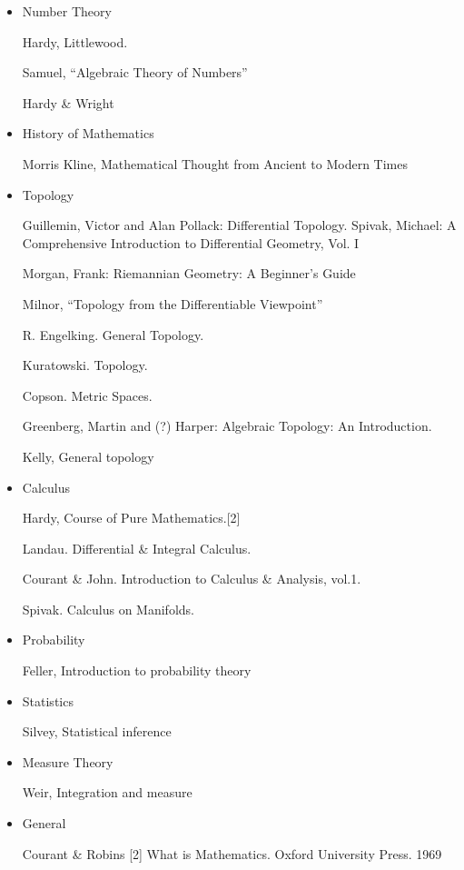 \begin{itemize}
  \item Number Theory

  Hardy, Littlewood.

  Samuel, ``Algebraic Theory of Numbers''

  Hardy \& Wright

  \item History of Mathematics

  Morris Kline, Mathematical Thought from Ancient to Modern Times

  \item Topology

  Guillemin, Victor and Alan Pollack: Differential Topology.  Spivak,
  Michael: A Comprehensive Introduction to Differential Geometry, Vol. I

  Morgan, Frank: Riemannian Geometry: A Beginner's Guide

  Milnor, ``Topology from the Differentiable Viewpoint''

  R. Engelking. General Topology.

  Kuratowski. Topology.

  Copson. Metric Spaces.

  Greenberg, Martin and (?) Harper: Algebraic Topology: An Introduction.

  Kelly, General topology

  \item Calculus

  Hardy, Course of Pure Mathematics.[2]

  Landau. Differential \& Integral Calculus.

  Courant \& John. Introduction to Calculus \& Analysis, vol.1.

  Spivak. Calculus on Manifolds.

  \item Probability

  Feller, Introduction to probability theory

  \item Statistics

  Silvey, Statistical inference

  \item Measure Theory

  Weir, Integration and measure

  \item General

  Courant \& Robins [2] What is Mathematics.  Oxford University Press.
  1969
\end{itemize}
